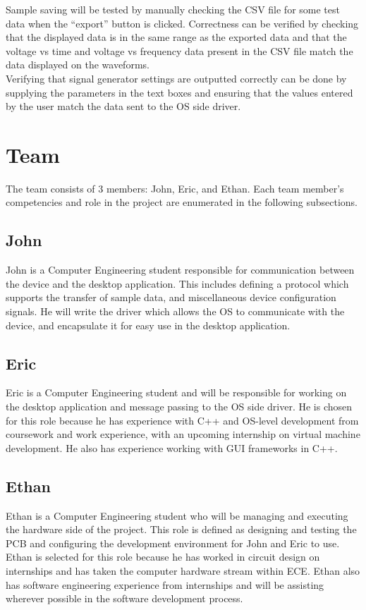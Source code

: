 \documentclass[letterpaper,12pt]{article}
\begin{document}
\noindent
Sample saving will be tested by manually checking the CSV file for some test
data when the ``export'' button is clicked. Correctness can be verified by
checking that the displayed data is in the same range as the exported data and
that the voltage vs time and voltage vs frequency data present in the CSV file
match the data displayed on the waveforms. \\

\noindent
Verifying that signal generator settings are outputted correctly can be done by
supplying the parameters in the text boxes and ensuring that the values entered
by the user match the data sent to the OS side driver.

\section{Team} %
The team consists of 3 members: John, Eric, and Ethan. Each team member's
competencies and role in the project are enumerated in the following
subsections.

\subsection{John}
John is a Computer Engineering student responsible for communication between the
device and the desktop application. This includes defining a protocol which
supports the transfer of sample data, and miscellaneous device configuration
signals. He will write the driver which allows the OS to communicate with the
device, and encapsulate it for easy use in the desktop application.

\subsection{Eric}
Eric is a Computer Engineering student and will be responsible for working on
the desktop application and message passing to the OS side driver. He is chosen
for this role because he has experience with C++ and OS-level development from
coursework and work experience, with an upcoming internship on virtual machine
development. He also has experience working with GUI frameworks in C++. 

\subsection{Ethan}
Ethan is a Computer Engineering student who will be managing and executing the
hardware side of the project. This role is defined as designing and testing the
PCB and configuring the development environment for John and Eric to use. Ethan
is selected for this role because he has worked in circuit design on internships
and has taken the computer hardware stream within ECE. Ethan also has software
engineering experience from internships and will be assisting wherever possible
in the software development process.
\end{document}
